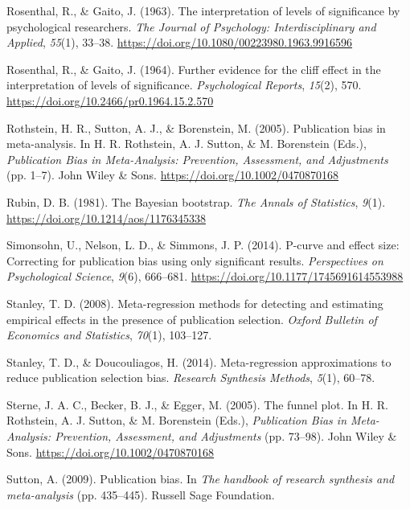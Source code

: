 \documentclass[
  man, donotrepeattitle,floatsintext]{apa7}
\newlength{\cslhangindent}
\newenvironment{CSLReferences}[2] %
 {\begin{list}{}{%
  \setlength{\itemindent}{0pt}
  \setlength{\leftmargin}{0pt}
  \setlength{\parsep}{0pt}
  \ifodd #1
   \setlength{\leftmargin}{\cslhangindent}
   \setlength{\itemindent}{-1\cslhangindent}
  \fi
  \setlength{\itemsep}{#2\baselineskip}}}
 {\end{list}}
\begin{document}
\begin{CSLReferences}{1}{0}
Rosenthal, R., \& Gaito, J. (1963). The interpretation of levels of significance by psychological researchers. \emph{The Journal of Psychology: Interdisciplinary and Applied}, \emph{55}(1), 33--38. \url{https://doi.org/10.1080/00223980.1963.9916596}

Rosenthal, R., \& Gaito, J. (1964). Further evidence for the cliff effect in the interpretation of levels of significance. \emph{Psychological Reports}, \emph{15}(2), 570. \url{https://doi.org/10.2466/pr0.1964.15.2.570}

Rothstein, H. R., Sutton, A. J., \& Borenstein, M. (2005). Publication bias in meta-analysis. In H. R. Rothstein, A. J. Sutton, \& M. Borenstein (Eds.), \emph{Publication {Bias} in {Meta-Analysis}: {Prevention}, {Assessment}, and {Adjustments}} (pp. 1--7). {John Wiley \& Sons}. \url{https://doi.org/10.1002/0470870168}

Rubin, D. B. (1981). The {Bayesian} bootstrap. \emph{The Annals of Statistics}, \emph{9}(1). \url{https://doi.org/10.1214/aos/1176345338}

Simonsohn, U., Nelson, L. D., \& Simmons, J. P. (2014). P-curve and effect size: Correcting for publication bias using only significant results. \emph{Perspectives on Psychological Science}, \emph{9}(6), 666--681. \url{https://doi.org/10.1177/1745691614553988}

Stanley, T. D. (2008). Meta-regression methods for detecting and estimating empirical effects in the presence of publication selection. \emph{Oxford Bulletin of Economics and Statistics}, \emph{70}(1), 103--127.

Stanley, T. D., \& Doucouliagos, H. (2014). Meta-regression approximations to reduce publication selection bias. \emph{Research Synthesis Methods}, \emph{5}(1), 60--78.

Sterne, J. A. C., Becker, B. J., \& Egger, M. (2005). The funnel plot. In H. R. Rothstein, A. J. Sutton, \& M. Borenstein (Eds.), \emph{Publication {Bias} in {Meta-Analysis}: {Prevention}, {Assessment}, and {Adjustments}} (pp. 73--98). {John Wiley \& Sons}. \url{https://doi.org/10.1002/0470870168}

Sutton, A. (2009). Publication bias. In \emph{The handbook of research synthesis and meta-analysis} (pp. 435--445). Russell Sage Foundation.


\end{CSLReferences}
\end{document}
